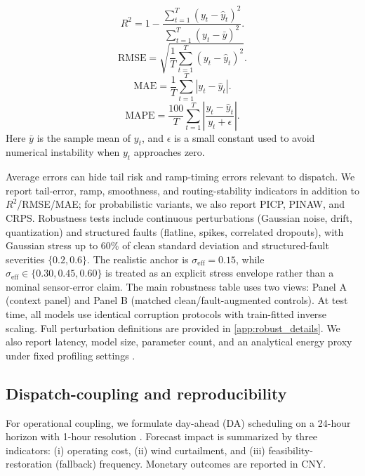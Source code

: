 \documentclass[review,1p,times]{elsarticle}
\begin{document}
\begin{equation}
R^2 = 1 - \frac{\sum_{t=1}^{T}(y_t - \hat{y}_t)^2}{\sum_{t=1}^{T}(y_t - \bar{y})^2}.
\end{equation}
\begin{equation}
\text{RMSE} = \sqrt{\frac{1}{T}\sum_{t=1}^{T}(y_t - \hat{y}_t)^2}.
\end{equation}
\begin{equation}
\text{MAE} = \frac{1}{T}\sum_{t=1}^{T}|y_t - \hat{y}_t|.
\end{equation}
\begin{equation}
\text{MAPE} = \frac{100}{T}\sum_{t=1}^{T}\left|\frac{y_t - \hat{y}_t}{y_t + \epsilon}\right|.
\end{equation}
Here $\bar{y}$ is the sample mean of $y_t$, and $\epsilon$ is a small constant used to avoid numerical instability when $y_t$ approaches zero.

Average errors can hide tail risk and ramp-timing errors relevant to dispatch. We report tail-error, ramp, smoothness, and routing-stability indicators in addition to $R^2$/RMSE/MAE; for probabilistic variants, we also report PICP, PINAW, and CRPS. Robustness tests include continuous perturbations (Gaussian noise, drift, quantization) and structured faults (flatline, spikes, correlated dropouts), with Gaussian stress up to 60\% of clean standard deviation and structured-fault severities $\{0.2,0.6\}$. The realistic anchor is $\sigma_{\mathrm{eff}}=0.15$, while $\sigma_{\mathrm{eff}}\in\{0.30,0.45,0.60\}$ is treated as an explicit stress envelope rather than a nominal sensor-error claim. The main robustness table uses two views: Panel A (context panel) and Panel B (matched clean/fault-augmented controls). At test time, all models use identical corruption protocols with train-fitted inverse scaling. Full perturbation definitions are provided in \ref{app:robust_details}. We also report latency, model size, parameter count, and an analytical energy proxy under fixed profiling settings \cite{schwartz2020greenai,strubell2019energy}.

\subsection{Dispatch-coupling and reproducibility}
\label{subsec:dispatch_setup}
For operational coupling, we formulate day-ahead (DA) scheduling on a 24-hour horizon with 1-hour resolution \cite{dlt5002_2021}. Forecast impact is summarized by three indicators: (i) operating cost, (ii) wind curtailment, and (iii) feasibility-restoration (fallback) frequency. Monetary outcomes are reported in CNY.
\end{document}
